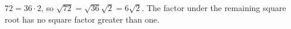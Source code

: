 $72=36\cdot2$, so $\sqrt{72}=\sqrt{36}\sqrt2=\boxed{6\sqrt2}$. The factor under the remaining square root has no square factor greater than one.
